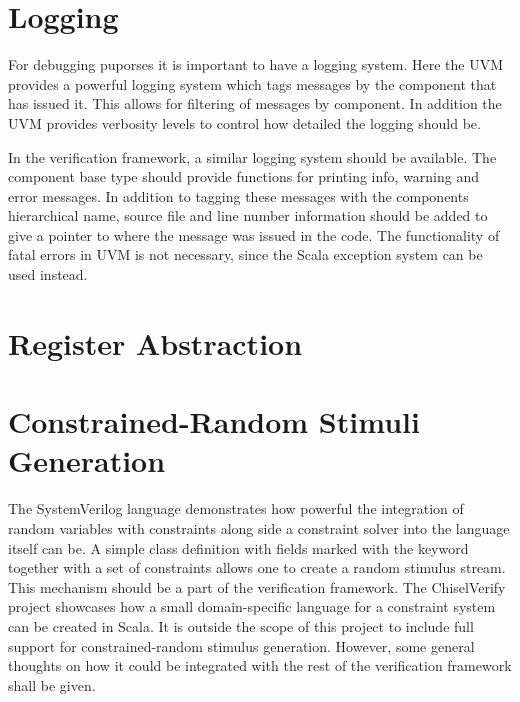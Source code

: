 \section{Logging} %
\label{sec:logging}

For debugging puporses it is important to have a logging system. Here the UVM provides a powerful logging system
which tags messages by the component that has issued it. This allows for filtering of messages by component. In
addition the UVM provides verbosity levels to control how detailed the logging should be.

In the verification framework, a similar logging system should be available. The component base type should provide
functions for printing info, warning and error messages. In addition to tagging these messages with the components
hierarchical name, source file and line number information should be added to give a pointer to where the message was
issued in the code. The functionality of fatal errors in UVM is not necessary, since the Scala exception system can
be used instead.

\section{Register Abstraction} %

\section{Constrained-Random Stimuli Generation} %
\label{sec:crv}

The SystemVerilog language demonstrates how powerful the integration of random variables with constraints along side
a constraint solver into the language itself can be. A simple class definition with fields marked with the 
keyword together with a set of constraints allows one to create a random stimulus stream. This mechanism should be a
part of the verification framework. The ChiselVerify project showcases how a small domain-specific language for a
constraint system can be created in Scala. It is outside the scope of this project to include full support for
constrained-random stimulus generation. However, some general thoughts on how it could be integrated with the rest of
the verification framework shall be given.

